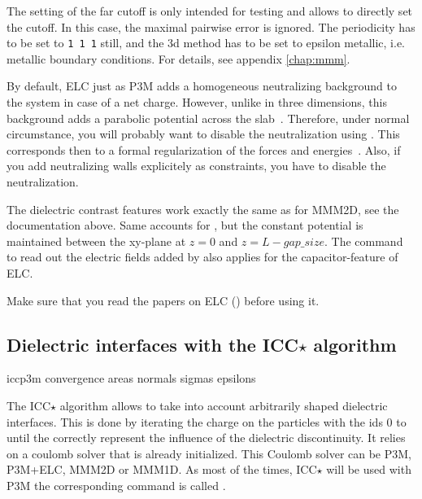 The setting of the far cutoff  is only intended for
testing and allows to directly set the cutoff. In this case, the
maximal pairwise error is ignored. The periodicity has to be set to
\texttt{1 1 1} still, and the 3d method has to be set to epsilon
metallic, i.e.  metallic boundary conditions. For details, see
appendix \vref{chap:mmm}.

By default, ELC just as P3M adds a homogeneous neutralizing background
to the system in case of a net charge. However, unlike in three
dimensions, this background adds a parabolic potential across the
slab~\cite{ballenegger09a}. Therefore, under normal circumstance, you
will probably want to disable the neutralization using
. This corresponds then to a formal
regularization of the forces and energies~\cite{ballenegger09a}. Also,
if you add neutralizing walls explicitely as constraints, you have to
disable the neutralization.

The dielectric contrast features work exactly the same as for MMM2D,
see the documentation above. Same accounts for  
, but the constant potential is maintained between the xy-plane
at $z=0$ and $z=L-gap\_size$. The command  to read  
out the electric fields added by   also applies 
for the capacitor-feature of ELC.

Make sure that you read the papers on ELC (\cite{elc,icelc})
before using it.

\subsection{Dielectric interfaces with the ICC$\star$ algorithm}

\begin{essyntax}
  iccp3m  
  convergence 
  areas 
  normals 
  sigmas 
  epsilons 
  \begin{features}
  \end{features}
\end{essyntax}

The ICC$\star$ algorithm allows to take into account arbitrarily
shaped dielectric interfaces.  This is done by iterating the charge on
the particles with the ids 0 to  until
the correctly represent the influence of the dielectric
discontinuity. It relies on a coulomb solver that is already
initialized. This Coulomb solver can be P3M, P3M+ELC, MMM2D or MMM1D.
As most of the times, ICC$\star$ will be used with P3M the
corresponding command is called .

